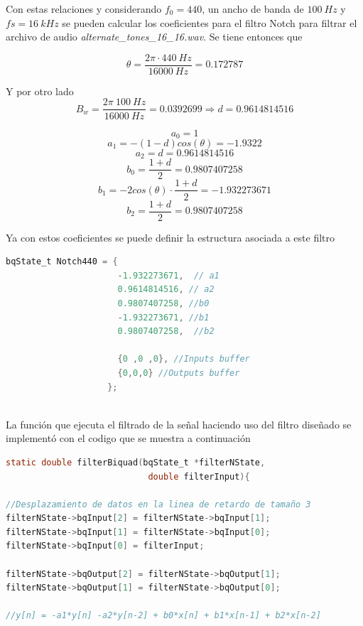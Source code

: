 \begin{enumerate}
     
     
     
     Con estas relaciones y considerando $f_0 = 440$, un ancho de banda de $100~Hz$ y $fs = 16 ~kHz$ se pueden calcular los coeficientes para el filtro Notch para filtrar el archivo de audio \textit{alternate\_tones\_16\_16.wav}. Se tiene entonces que 
     
     
     $$ \theta = \frac{2\pi \cdot440~Hz}{16000~Hz} = 0.172787 $$
     
     Y por otro lado 
      $$B_w = \frac{2\pi ~ 100~Hz}{16000~Hz}  = 0.0392699 \Rightarrow d = 0.9614814516$$
     
     $$ a_0 = 1$$
     $$a_1 = -(1-d)cos(\theta) = -1.9322 $$
     $$ a_2 = d =  0.9614814516 $$
     $$ b_0 = \frac{1+d}{2} = 0.9807407258 $$
     $$ b_1 = -2cos(\theta)\cdot \frac{1+d}{2} =  -1.932273671$$
     $$ b_2 = \frac{1+d}{2} = 0.9807407258  $$
     
     Ya con estos coeficientes se puede definir la estructura asociada a este filtro
     
     \begin{lstlisting}[language = C]
        bqState_t Notch440 = {
                      -1.932273671,  // a1
                      0.9614814516, // a2
                      0.9807407258, //b0
                      -1.932273671, //b1
                      0.9807407258,  //b2

                      {0 ,0 ,0}, //Inputs buffer
                      {0,0,0} //Outputs buffer
                    };



     \end{lstlisting}
     
     
    La función que ejecuta el filtrado de la señal haciendo uso del filtro diseñado se implementó con el codigo que se muestra a continuación
    
    \begin{lstlisting}[language = C]
static double filterBiquad(bqState_t *filterNState,
                            double filterInput){
      
//Desplazamiento de datos en la linea de retardo de tamaño 3
filterNState->bqInput[2] = filterNState->bqInput[1];
filterNState->bqInput[1] = filterNState->bqInput[0];
filterNState->bqInput[0] = filterInput;
    
filterNState->bqOutput[2] = filterNState->bqOutput[1];
filterNState->bqOutput[1] = filterNState->bqOutput[0];
    
//y[n] = -a1*y[n] -a2*y[n-2] + b0*x[n] + b1*x[n-1] + b2*x[n-2]
    

\end{lstlisting}
\end{enumerate}
